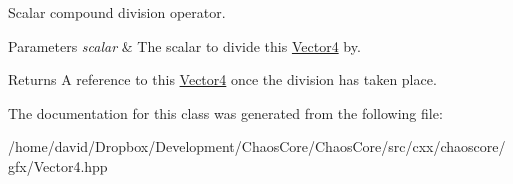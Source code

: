Scalar compound division operator. 


\begin{DoxyParams}{Parameters}
{\em scalar} & The scalar to divide this \hyperlink{classchaos_1_1gfx_1_1_vector4}{Vector4} by. \\
\hline
\end{DoxyParams}
\begin{DoxyReturn}{Returns}
A reference to this \hyperlink{classchaos_1_1gfx_1_1_vector4}{Vector4} once the division has taken place. 
\end{DoxyReturn}


The documentation for this class was generated from the following file\-:\begin{DoxyCompactItemize}
\item 
/home/david/\-Dropbox/\-Development/\-Chaos\-Core/\-Chaos\-Core/src/cxx/chaoscore/gfx/Vector4.\-hpp\end{DoxyCompactItemize}

